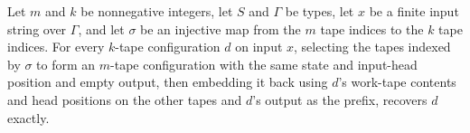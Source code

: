 \begin{theorem}
\label{Turing.embedEmitCfg_select}
\leanok
{}
Let $m$ and $k$ be nonnegative integers, let $S$ and $\Gamma$ be types, let $x$ be a
finite input string over $\Gamma$, and let $\sigma$ be an injective map from the $m$
tape indices to the $k$ tape indices. For every $k$-tape configuration $d$ on input $x$,
selecting the tapes indexed by $\sigma$ to form an $m$-tape configuration with the same
state and input-head position and empty output, then embedding it back using $d$'s
work-tape contents and head positions on the other tapes and $d$'s output as the prefix,
recovers $d$ exactly.
\end{theorem}
